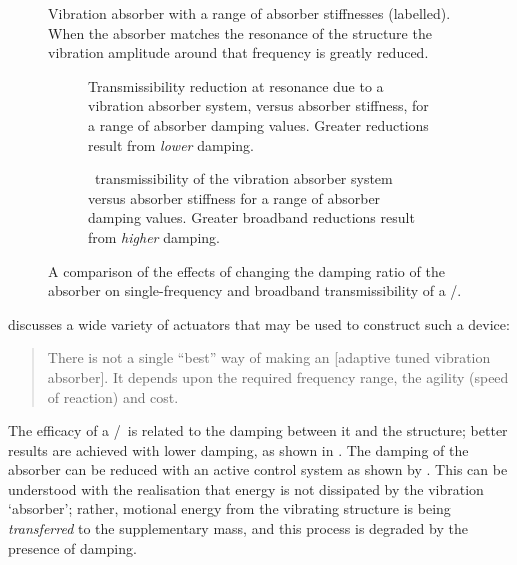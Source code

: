 \begin{figure}
   \caption{Vibration absorber with a range of absorber stiffnesses (labelled). 
   When the absorber matches the resonance of the structure the vibration 
   amplitude around that frequency is greatly reduced.}
\end{figure}

\begin{figure}
\begin{wide}
  \begin{subfigure}
    \caption{Transmissibility reduction at resonance due to a vibration 
    absorber system, versus absorber stiffness, for a range of absorber 
    damping values. Greater reductions result from \emph{lower} damping.}
  \end{subfigure}
  \begin{subfigure}
    \caption{\RMS\ transmissibility of the vibration absorber system versus 
    absorber stiffness for a range of absorber damping values. Greater 
    broadband reductions result from \emph{higher} damping.}
  \end{subfigure}
\end{wide}
\caption{A comparison of the effects of changing the damping ratio of the 
absorber on single-frequency and broadband transmissibility of a \vibneut/.}
\end{figure}

\textcite{brennan2006} discusses a wide variety of actuators that may
be used to construct such a device:
\begin{quote}
  There is not a single ``best'' way of making an [adaptive tuned
  vibration absorber]. It depends upon the required frequency range,
  the agility (speed of reaction) and cost.
\end{quote}

The efficacy of a \vibneut/\ is related to the damping between
it and the structure; better results are achieved with lower damping, as shown
in . The damping of the absorber can be reduced with an
active control system as shown by \textcite{kidner1998}. This can be
understood with the realisation that energy is not dissipated by the vibration
`absorber'; rather, motional energy from the vibrating structure is being
\emph{transferred} to the supplementary mass, and this process is degraded by
the presence of damping. 

